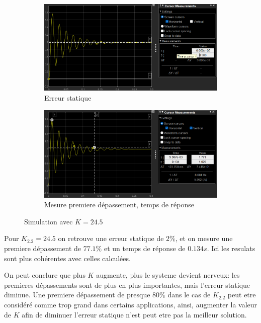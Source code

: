 \documentclass[12pt, a4paper]{report}
\begin{document}
\begin{figure}[H]
    \begin{subfigure}[h!]{0.4\linewidth}
        \includegraphics[width=\linewidth]{sim2kpourerreur2prcerreur.png}
        \caption{Erreur statique}
    \end{subfigure}
    \hfill    
    \begin{subfigure}[h!]{0.4\linewidth}
        \includegraphics[width=\linewidth]{sim2kpourerreur2prcdeptr.png}
        \caption{Mesure premiere dépassement, temps de réponse}
    \end{subfigure}
    \caption{Simulation avec $K = 24.5$}
    \label{fig:sim2Kpour10prc}
\end{figure}

Pour $K_{2.2} = 24.5$ on retrouve une erreur statique de $2\%$, et on mesure une premiere dépassement de $77.1\%$ et un temps de réponse de 
$0.134s$. Ici les resulats sont plus cohérentes avec celles calculées.

On peut conclure que plus $K$ augmente, plus le systeme devient nerveux: les premieres dépassements sont de plus en plus importantes, mais l'erreur statique diminue.
Une premiere dépassement de presque $80\%$ dans le cas de $K_{2.2}$ peut etre considéré comme trop grand dans certains applications, ainsi, augmenter la valeur de $K$ afin de 
diminuer l'erreur statique n'est peut etre pas la meilleur solution.
\end{document}
